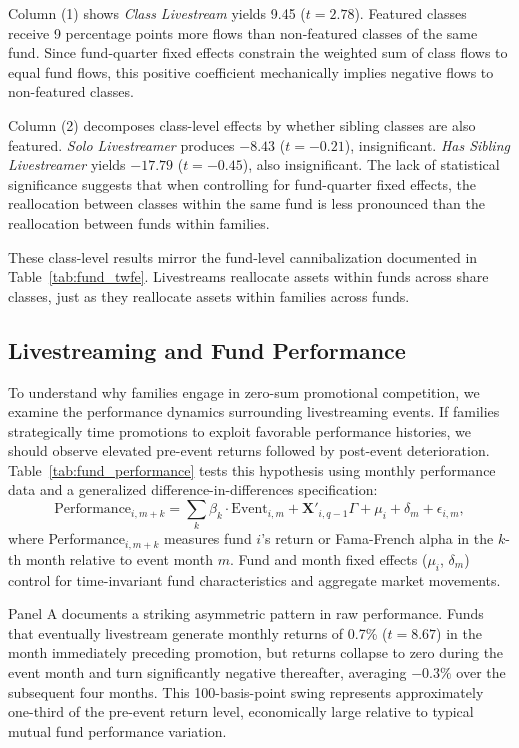 \documentclass[12pt]{article}
\begin{document}
Column (1) shows \textit{Class Livestream} yields 9.45 ($t = 2.78$). Featured classes receive 9 percentage points more flows than non-featured classes of the same fund. Since fund-quarter fixed effects constrain the weighted sum of class flows to equal fund flows, this positive coefficient mechanically implies negative flows to non-featured classes.

Column (2) decomposes class-level effects by whether sibling classes are also featured. \textit{Solo Livestreamer} produces $-8.43$ ($t = -0.21$), insignificant. \textit{Has Sibling Livestreamer} yields $-17.79$ ($t = -0.45$), also insignificant. The lack of statistical significance suggests that when controlling for fund-quarter fixed effects, the reallocation between classes within the same fund is less pronounced than the reallocation between funds within families.

These class-level results mirror the fund-level cannibalization documented in Table~\ref{tab:fund_twfe}. Livestreams reallocate assets within funds across share classes, just as they reallocate assets within families across funds.


\subsection{Livestreaming and Fund Performance}\label{subsec:fund_performance}

To understand why families engage in zero-sum promotional competition, we examine the performance dynamics surrounding livestreaming events. If families strategically time promotions to exploit favorable performance histories, we should observe elevated pre-event returns followed by post-event deterioration. Table~\ref{tab:fund_performance} tests this hypothesis using monthly performance data and a generalized difference-in-differences specification:
\begin{equation}
    \label{eq:fund_performance}
    \text{Performance}_{i,m+k} = \sum_k \beta_k \cdot \text{Event}_{i,m} + \mathbf{X}'_{i,q-1} \Gamma + \mu_i + \delta_m + \epsilon_{i,m},
\end{equation}
where Performance$_{i,m+k}$ measures fund $i$'s return or Fama-French alpha in the $k$-th month relative to event month $m$. Fund and month fixed effects ($\mu_i$, $\delta_m$) control for time-invariant fund characteristics and aggregate market movements.

Panel A documents a striking asymmetric pattern in raw performance. Funds that eventually livestream generate monthly returns of 0.7\% ($t = 8.67$) in the month immediately preceding promotion, but returns collapse to zero during the event month and turn significantly negative thereafter, averaging $-0.3\%$ over the subsequent four months. This 100-basis-point swing represents approximately one-third of the pre-event return level, economically large relative to typical mutual fund performance variation.
\end{document}
